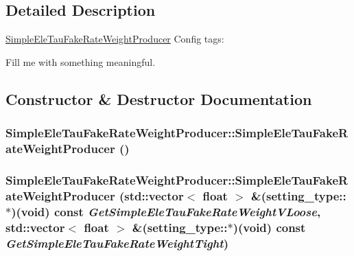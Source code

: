 \subsection{Detailed Description}
\hyperlink{classSimpleEleTauFakeRateWeightProducer}{SimpleEleTauFakeRateWeightProducer} Config tags:
\begin{DoxyItemize}
\item Fill me with something meaningful. 
\end{DoxyItemize}

\subsection{Constructor \& Destructor Documentation}
\hypertarget{classSimpleEleTauFakeRateWeightProducer_acba890354b0cef94070c41431d311841}{
\subsubsection[{SimpleEleTauFakeRateWeightProducer}]{\setlength{\rightskip}{0pt plus 5cm}SimpleEleTauFakeRateWeightProducer::SimpleEleTauFakeRateWeightProducer ()}}
\label{classSimpleEleTauFakeRateWeightProducer_acba890354b0cef94070c41431d311841}
\hypertarget{classSimpleEleTauFakeRateWeightProducer_a7e823f4f9e2d9b660b162f0b1fbdd6b8}{
\subsubsection[{SimpleEleTauFakeRateWeightProducer}]{\setlength{\rightskip}{0pt plus 5cm}SimpleEleTauFakeRateWeightProducer::SimpleEleTauFakeRateWeightProducer (std::vector$<$ float $>$ \&(setting\_\-type::$\ast$)(void) const  {\em GetSimpleEleTauFakeRateWeightVLoose}, \/  std::vector$<$ float $>$ \&(setting\_\-type::$\ast$)(void) const  {\em GetSimpleEleTauFakeRateWeightTight})}}
\label{classSimpleEleTauFakeRateWeightProducer_a7e823f4f9e2d9b660b162f0b1fbdd6b8}


